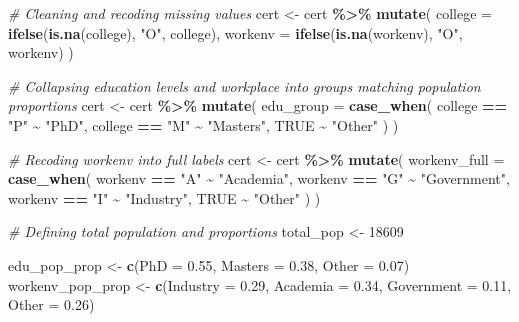 \documentclass[]{article}
\newenvironment{Shaded}{\begin{snugshade}}{\end{snugshade}}
\newcommand{\AttributeTok}[1]{\textcolor[rgb]{0.13,0.29,0.53}{#1}}
\newcommand{\CommentTok}[1]{\textcolor[rgb]{0.56,0.35,0.01}{\textit{#1}}}
\newcommand{\ConstantTok}[1]{\textcolor[rgb]{0.56,0.35,0.01}{#1}}
\newcommand{\DecValTok}[1]{\textcolor[rgb]{0.00,0.00,0.81}{#1}}
\newcommand{\FloatTok}[1]{\textcolor[rgb]{0.00,0.00,0.81}{#1}}
\newcommand{\FunctionTok}[1]{\textcolor[rgb]{0.13,0.29,0.53}{\textbf{#1}}}
\newcommand{\NormalTok}[1]{#1}
\newcommand{\OtherTok}[1]{\textcolor[rgb]{0.56,0.35,0.01}{#1}}
\newcommand{\SpecialCharTok}[1]{\textcolor[rgb]{0.81,0.36,0.00}{\textbf{#1}}}
\newcommand{\StringTok}[1]{\textcolor[rgb]{0.31,0.60,0.02}{#1}}
\begin{document}
\begin{Shaded}
\begin{Highlighting}[]
\CommentTok{\# Cleaning and recoding missing values }
\NormalTok{cert }\OtherTok{\textless{}{-}}\NormalTok{ cert }\SpecialCharTok{\%\textgreater{}\%}
  \FunctionTok{mutate}\NormalTok{(}
    \AttributeTok{college =} \FunctionTok{ifelse}\NormalTok{(}\FunctionTok{is.na}\NormalTok{(college), }\StringTok{"O"}\NormalTok{, college),}
    \AttributeTok{workenv =} \FunctionTok{ifelse}\NormalTok{(}\FunctionTok{is.na}\NormalTok{(workenv), }\StringTok{"O"}\NormalTok{, workenv)}
\NormalTok{  )}

\CommentTok{\# Collapsing education levels and workplace into groups matching population}
\CommentTok{   proportions }
\NormalTok{cert }\OtherTok{\textless{}{-}}\NormalTok{ cert }\SpecialCharTok{\%\textgreater{}\%}
  \FunctionTok{mutate}\NormalTok{(}
    \AttributeTok{edu\_group =} \FunctionTok{case\_when}\NormalTok{(}
\NormalTok{      college }\SpecialCharTok{==} \StringTok{"P"} \SpecialCharTok{\textasciitilde{}} \StringTok{"PhD"}\NormalTok{,     }
\NormalTok{      college }\SpecialCharTok{==} \StringTok{"M"} \SpecialCharTok{\textasciitilde{}} \StringTok{"Masters"}\NormalTok{,     }
      \ConstantTok{TRUE} \SpecialCharTok{\textasciitilde{}} \StringTok{"Other"}                  
\NormalTok{    )}
\NormalTok{  )}

\CommentTok{\# Recoding workenv into full labels}
\NormalTok{cert }\OtherTok{\textless{}{-}}\NormalTok{ cert }\SpecialCharTok{\%\textgreater{}\%}
  \FunctionTok{mutate}\NormalTok{(}
    \AttributeTok{workenv\_full =} \FunctionTok{case\_when}\NormalTok{(}
\NormalTok{      workenv }\SpecialCharTok{==} \StringTok{"A"} \SpecialCharTok{\textasciitilde{}} \StringTok{"Academia"}\NormalTok{,}
\NormalTok{      workenv }\SpecialCharTok{==} \StringTok{"G"} \SpecialCharTok{\textasciitilde{}} \StringTok{"Government"}\NormalTok{,}
\NormalTok{      workenv }\SpecialCharTok{==} \StringTok{"I"} \SpecialCharTok{\textasciitilde{}} \StringTok{"Industry"}\NormalTok{, }
      \ConstantTok{TRUE} \SpecialCharTok{\textasciitilde{}} \StringTok{"Other"}
\NormalTok{    )}
\NormalTok{  )}

\CommentTok{\# Defining total population and proportions}
\NormalTok{total\_pop }\OtherTok{\textless{}{-}} \DecValTok{18609}

\NormalTok{edu\_pop\_prop }\OtherTok{\textless{}{-}} \FunctionTok{c}\NormalTok{(}\AttributeTok{PhD =} \FloatTok{0.55}\NormalTok{, }\AttributeTok{Masters =} \FloatTok{0.38}\NormalTok{, } 
    \NormalTok{}\AttributeTok{Other =} \FloatTok{0.07}\NormalTok{)}
\NormalTok{workenv\_pop\_prop }\OtherTok{\textless{}{-}} \FunctionTok{c}\NormalTok{(}\AttributeTok{Industry =} \FloatTok{0.29}\NormalTok{, }\AttributeTok{Academia =} \FloatTok{0.34}\NormalTok{, }\AttributeTok{Government =} \FloatTok{0.11}\NormalTok{, }\AttributeTok{Other =} \FloatTok{0.26}\NormalTok{)}


\end{Highlighting}
\end{Shaded}
\end{document}
